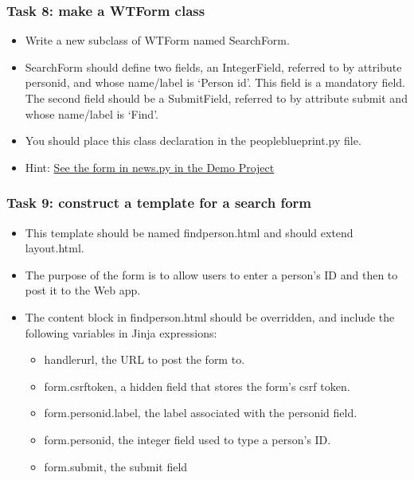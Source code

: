 \documentclass{beamer}
\begin{document}
	\begin{frame}
		\frametitle{Task 8: make a WTForm class}
		\begin{itemize}
			\item Write a new subclass of WTForm named SearchForm.
			\item SearchForm should define two fields, an IntegerField, referred to by attribute person\textunderscore{}id, and whose name/label is ‘Person id’. This field is a mandatory field. The second field should be a SubmitField, referred to by attribute submit and whose name/label is ‘Find’.
			\item You should place this class declaration in the people\textunderscore{}blueprint\people.py file.
            \item Hint:  \href{https://github.com/martinurschler/2021CompSci235-03-CovidWebApp/blob/main/covid/news/news.py}{See the form in news.py in the Demo Project}

		\end{itemize}
	\end{frame}

	\begin{frame}
		\frametitle{Task 9: construct a template for a search form}
		\begin{itemize}
			\item This template should be named find\textunderscore{}person.html and should extend layout.html.
			\item The purpose of the form is to allow users to enter a person’s ID and then to post it to the Web app.
			\item The content block in find\textunderscore{}person.html should be overridden, and include the following variables in Jinja expressions:
			\begin{itemize}
			    \item handler\textunderscore{}url, the URL to post the form to.
                \item form.csrf\textunderscore{}token, a hidden field that stores the form’s csrf token.
                \item form.person\textunderscore{}id.label, the label associated with the person\textunderscore{}id field.
                \item form.person\textunderscore{}id, the integer field used to type a person’s ID.
                \item form.submit, the submit field
            \end{itemize}
		\end{itemize}
	\end{frame}
\end{document}
